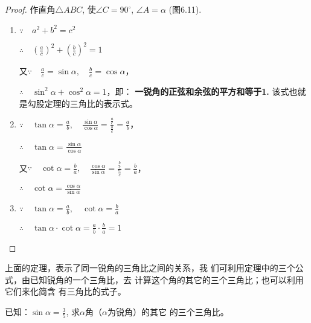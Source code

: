 \begin{proof}
    作直角$\triangle ABC$, 使$\angle C=90^{\circ}$, $\angle A=\alpha$ (图6.11).
    \begin{figure}[htp]
        \centering
        \caption{}
    \end{figure}
    
\begin{enumerate}
    \item $\because\quad  a^2+b^2=c^2$
    
    $\therefore\quad \left(\frac{a}{c}\right)^2+\left(\frac{b}{c}\right)^2=1$

    又$\because\quad \frac{a}{c}=\sin\alpha,\quad \frac{b}{c}=\cos\alpha$，

    $\therefore\quad \sin^2\alpha  +\cos^2\alpha =1$，即：
\textbf{一锐角的正弦和余弦的平方和等于1.}
该式也就是勾股定理的三角比的表示式。

\item $\because\quad \tan\alpha=\frac{a}{b},\quad \frac{\sin\alpha}{\cos\alpha}=\frac{\frac{a}{c}}{\frac{b}{c}}=\frac{a}{b}$，

$\therefore\quad \tan\alpha=\frac{\sin\alpha}{\cos\alpha}$

又$\because\quad \cot\alpha=\frac{b}{a},\quad \frac{\cos\alpha}{\sin\alpha}=\frac{\frac{b}{c}}{\frac{a}{c}}=\frac{b}{a}$，

$\therefore\quad \cot\alpha=\frac{\cos\alpha}{\sin\alpha}$

\item $\because\quad \tan\alpha=\frac{a}{b},\quad \cot\alpha=\frac{b}{a}$

$\therefore\quad \tan\alpha\cdot \cot\alpha=\frac{a}{b}\cdot \frac{b}{a}=1$
\end{enumerate}
\end{proof}

上面的定理，表示了同一锐角的三角比之间的关系，我
们可利用定理中的三个公式，由已知锐角的一个三角比，去
计算这个角的其它的三个三角比；也可以利用它们来化简含
有三角比的式子。


\begin{example}
    已知：$\sin\alpha=\frac{3}{5}$, 
    求$\alpha$角（$\alpha$为锐角）的其它
    的三个三角比。
\end{example}



